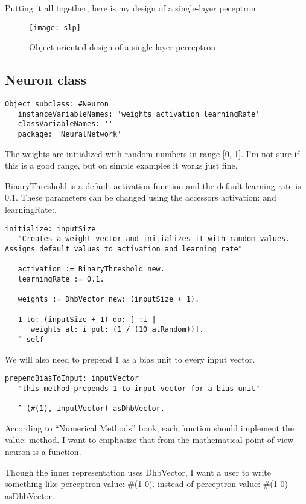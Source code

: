 Putting it all together, here is my design of a single-layer peceptron:

\begin{figure}[H]
  \centering
  \texttt{[image: slp]}
  \caption{Object-oriented design of a single-layer perceptron}
  \label{fig:slp2}
\end{figure}

\subsection{Neuron class}
\begin{lstlisting}
Object subclass: #Neuron
   instanceVariableNames: 'weights activation learningRate'
   classVariableNames: ''
   package: 'NeuralNetwork'
\end{lstlisting}

The weights are initialized with random numbers in range [0, 1]. I’m not sure if this is a good range, but on simple examples it works just fine.

BinaryThreshold is a default activation function and the default learning rate is 0.1. These parameters can be changed using the accessors activation: and learningRate:.

\begin{lstlisting}
initialize: inputSize
   "Creates a weight vector and initializes it with random values. Assigns default values to activation and learning rate"

   activation := BinaryThreshold new.
   learningRate := 0.1.
 
   weights := DhbVector new: (inputSize + 1).
 
   1 to: (inputSize + 1) do: [ :i |
      weights at: i put: (1 / (10 atRandom))].
   ^ self
\end{lstlisting}

We will also need to prepend 1 as a bias unit to every input vector.

\begin{lstlisting}
prependBiasToInput: inputVector
   "this method prepends 1 to input vector for a bias unit"
 
   ^ (#(1), inputVector) asDhbVector.
\end{lstlisting}

According to “Numerical Methods” book, each function should implement the value: method. I want to emphasize that from the mathematical point of view neuron is a function.

Though the inner representation uses DhbVector, I want a user to write something like perceptron value: \#(1 0). instead of perceptron value: \#(1 0) asDhbVector.

